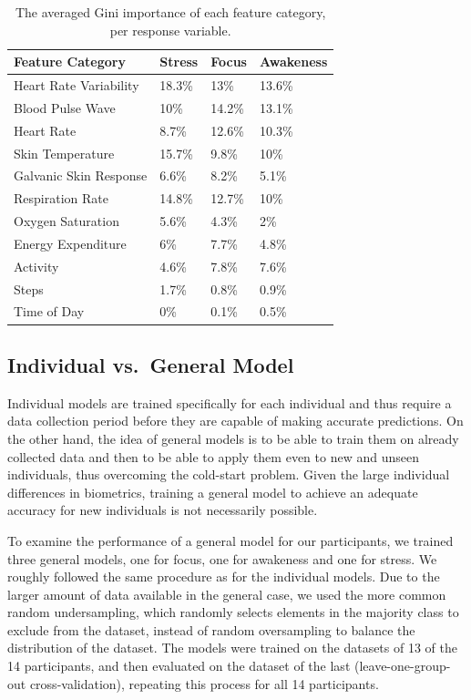 \begin{table}[h!]
  \begin{centering}
  \begin{tabular}{llll}
    \hline
    Feature Category & Stress & Focus & Awakeness\\
    \hline
    Heart Rate Variability & 18.3\% & 13\% & 13.6\%\\
    Blood Pulse Wave & 10\% & 14.2\% & 13.1\%\\
    Heart Rate & 8.7\% & 12.6\% & 10.3\%\\
    Skin Temperature & 15.7\% & 9.8\% & 10\%\\
    Galvanic Skin Response & 6.6\% & 8.2\% & 5.1\%\\
    Respiration Rate & 14.8\% & 12.7\% & 10\%\\
    Oxygen Saturation & 5.6\% & 4.3\% & 2\%\\ 
    Energy Expenditure & 6\% & 7.7\% & 4.8\%\\
    Activity & 4.6\% & 7.8\% & 7.6\%\\
    Steps & 1.7\% & 0.8\% & 0.9\%\\
    Time of Day & 0\% & 0.1\% & 0.5\%\\
    \hline
  \end{tabular}
  \caption{The averaged Gini importance of each feature category, per response variable.}
  \label{tab:featureImportance}
  \end{centering}
  \vspace*{-2mm}
\end{table}

\subsection{Individual vs.\ General Model}
Individual models are trained specifically for each individual and thus require a data collection period before they are capable of making accurate predictions. On the other hand, the idea of general models is to be able to train them on already collected data and then  to be able to apply them even to new and unseen individuals, thus overcoming the cold-start problem. Given the large individual differences in biometrics, training a general model to achieve an adequate accuracy for new individuals is not necessarily possible. 

To examine the performance of a general model for our participants, we trained three general models, one for focus, one for awakeness and one for stress. We roughly followed the same procedure as for the individual models. Due to the larger amount of data available in the general case, we used the more common random undersampling, which randomly selects elements in the majority class to exclude from the dataset, instead of random oversampling to balance the distribution of the dataset. The models were trained on the datasets of 13 of the 14 participants, and then evaluated on the dataset of the last (leave-one-group-out cross-validation), repeating this process for all 14 participants. 

